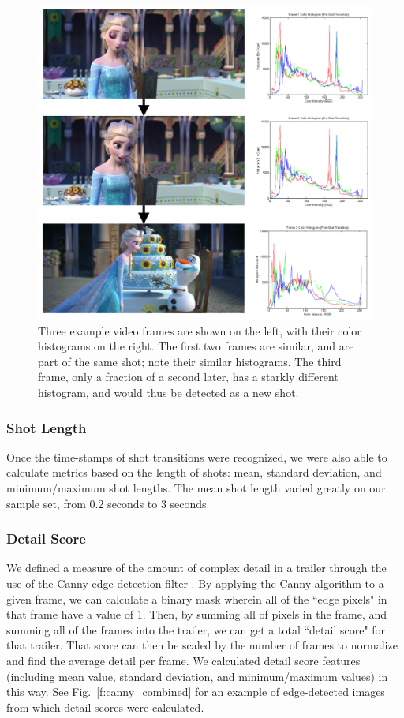 \documentclass[letterpaper, 10 pt, conference]{ieeeconf}  %
\begin{document}
\begin{figure}[h]
	\centering
	\includegraphics[width=\columnwidth]{histograms_combined.png}
	\caption{Three example video frames are shown on the left, with their color histograms on the right. The first two frames are similar, and are part of the same shot; note their similar histograms. The third frame, only a fraction of a second later, has a starkly different histogram, and would thus be detected as a new shot.}
	\label{f:histograms_combined}
\end{figure}

\subsubsection{Shot Length}
Once the time-stamps of shot transitions were recognized, we were also able to calculate metrics based on the length of shots: mean, standard deviation, and minimum/maximum shot lengths. The mean shot length varied greatly on our sample set, from 0.2 seconds to 3 seconds.

\subsubsection{Detail Score}
We defined a measure of the amount of complex detail in a trailer through the use of the Canny edge detection filter \cite{canny}. By applying the Canny algorithm to a given frame, we can calculate a binary mask wherein all of the ``edge pixels" in that frame have a value of 1. Then, by summing all of pixels in the frame, and summing all of the frames into the trailer, we can get a total ``detail score" for that trailer. That score can then be scaled by the number of frames to normalize and find the average detail per frame. We calculated detail score features (including mean value, standard deviation, and minimum/maximum values) in this way. See Fig.~\ref{f:canny_combined} for an example of edge-detected images from which detail scores were calculated.
\end{document}
